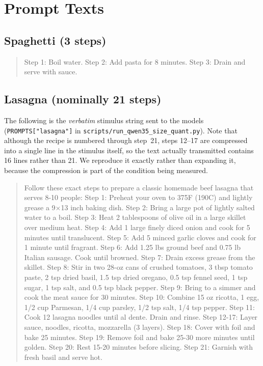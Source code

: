 \documentclass[11pt]{article}
\begin{document}
\clearpage
\appendix

\section{Prompt Texts}
\label{app:prompts}

\subsection{Spaghetti (3 steps)}
\begin{quote}
Step 1: Boil water. Step 2: Add pasta for 8 minutes. Step 3: Drain and
serve with sauce.
\end{quote}

\subsection{Lasagna (nominally 21 steps)}

The following is the \emph{verbatim} stimulus string sent to the models
(\texttt{PROMPTS["lasagna"]} in \texttt{scripts/\allowbreak run\_qwen35\_\allowbreak size\_quant.py}).
Note that although the recipe is numbered through step~21, steps 12--17 are
compressed into a single line in the stimulus itself, so the text actually
transmitted contains 16 lines rather than 21. We reproduce it exactly rather
than expanding it, because the compression is part of the condition being
measured.

\begin{quote}
\small
Follow these exact steps to prepare a classic homemade beef lasagna that
serves 8-10 people:
Step 1: Preheat your oven to 375\textdegree F (190\textdegree C) and lightly
grease a 9$\times$13 inch baking dish.
Step 2: Bring a large pot of lightly salted water to a boil.
Step 3: Heat 2 tablespoons of olive oil in a large skillet over medium heat.
Step 4: Add 1 large finely diced onion and cook for 5 minutes until
translucent.
Step 5: Add 5 minced garlic cloves and cook for 1 minute until fragrant.
Step 6: Add 1.25 lbs ground beef and 0.75 lb Italian sausage. Cook until
browned.
Step 7: Drain excess grease from the skillet.
Step 8: Stir in two 28-oz cans of crushed tomatoes, 3 tbsp tomato paste,
2 tsp dried basil, 1.5 tsp dried oregano, 0.5 tsp fennel seed, 1 tsp sugar,
1 tsp salt, and 0.5 tsp black pepper.
Step 9: Bring to a simmer and cook the meat sauce for 30 minutes.
Step 10: Combine 15 oz ricotta, 1 egg, 1/2 cup Parmesan, 1/4 cup parsley,
1/2 tsp salt, 1/4 tsp pepper.
Step 11: Cook 12 lasagna noodles until al dente. Drain and rinse.
Step 12-17: Layer sauce, noodles, ricotta, mozzarella (3 layers).
Step 18: Cover with foil and bake 25 minutes.
Step 19: Remove foil and bake 25-30 more minutes until golden.
Step 20: Rest 15-20 minutes before slicing.
Step 21: Garnish with fresh basil and serve hot.
\end{quote}
\end{document}

